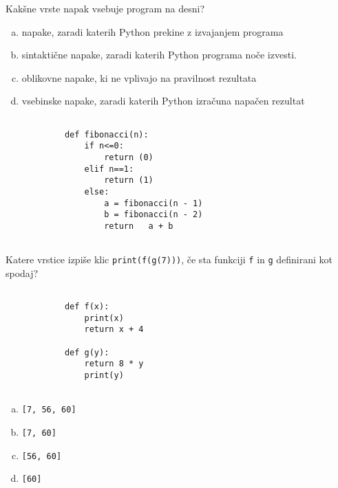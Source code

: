 \documentclass[arhiv, 10pt]{../izpit}
\newcommand{\inlinepy}[1]{\texttt{#1}}
\begin{document}
        \naloga*
        \begin{multicols}{2}
        \noindent
        Kakšne vrste napak vsebuje program na desni?

        \begin{enumerate}[(a)]
\item napake, zaradi katerih Python prekine z izvajanjem programa
\item sintaktične napake, zaradi katerih Python programa noče izvesti.
\item oblikovne napake, ki ne vplivajo na pravilnost rezultata
\item vsebinske napake, zaradi katerih Python izračuna napačen rezultat
\end{enumerate}

        \columnbreak

        \begin{verbatim}
        
            def fibonacci(n):
                if n<=0:
                    return (0)
                elif n==1:
                    return (1)
                else:
                    a = fibonacci(n - 1)
                    b = fibonacci(n - 2)
                    return   a + b
            
        \end{verbatim}

        \end{multicols}

    
        \naloga*
        Katere vrstice izpiše klic \inlinepy{print(f(g(7)))}, če sta funkciji \inlinepy{f} in \inlinepy{g} definirani kot spodaj?

        \begin{multicols}{2}
        \begin{verbatim}
        
            def f(x):
                print(x)
                return x + 4

            def g(y):
                return 8 * y
                print(y)
        
        \end{verbatim}

        \begin{enumerate}[(a)]
\item \inlinepy{[7, 56, 60]}
\item \inlinepy{[7, 60]}
\item \inlinepy{[56, 60]}
\item \inlinepy{[60]}
\end{enumerate}

        \end{multicols}
    
\end{document}
